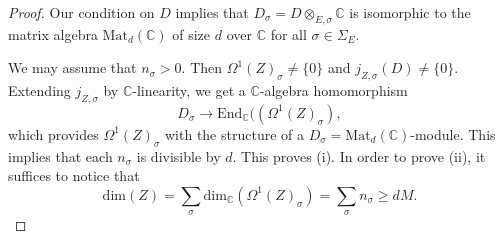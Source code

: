 \documentclass[12pt,a4paper,reqno]{amsart}
\def\C{{\mathbb C}}
\def\End{\mathrm{End}}
\def\Mat{\mathrm{Mat}}
\def\dim{\mathrm{dim}}
\theoremstyle{definition}
\begin{document}
\begin{proof}
Our condition on $D$ implies that 
$D_{\sigma}=D\otimes_{E,\sigma}\C$ is isomorphic to the matrix algebra $\Mat_d(\C)$ of size $d$ over $\C$ for all $\sigma \in \Sigma_E$.

We may assume that $n_{\sigma}>0$. Then $\Omega^1(Z)_{\sigma}\ne \{0\}$ and
$j_{Z,\sigma}(D) \ne \{0\}$. Extending $j_{Z,\sigma}$ by $\C$-linearity, we get a $\C$-algebra homomorphism
$$D_{\sigma} \to \End_{\C}((\Omega^1(Z)_{\sigma}),$$
which provides  $\Omega^1(Z)_{\sigma}$  with the structure of a $D_{\sigma}=\Mat_d(\C)$-module. This implies that each
$n_{\sigma}$
is divisible by $d$. This proves (i). In order to prove  (ii), it suffices to notice that
$$\dim(Z)=\sum_{\sigma}\dim_{\C}(\Omega^1(Z)_{\sigma})=\sum_{\sigma} n_{\sigma} \ge dM.$$


\end{proof}
\end{document}
